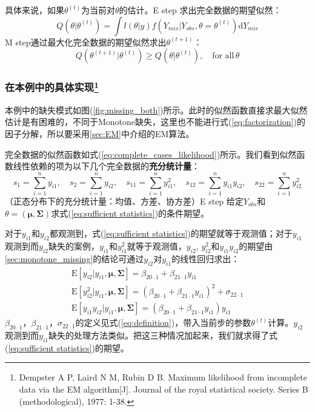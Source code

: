 \documentclass[aps,pre,12pt,preprint,onecolumn,showpacs,showkeys,AutoFakeBold]{revtex4-1}
\def \d {\mathrm d}
\begin{document}
        具体来说，如果$\theta ^{(t)}$为当前对$\theta$的估计。E step 求出完全数据的期望似然：
        \begin{equation}
            Q(\theta \vert \theta ^{(t)})=\int l(\theta \vert y)f(Y_{mis}\vert Y_{obs}, \theta=\theta^{(t)})\d Y_{mis}
        \end{equation}
        M step通过最大化完全数据的期望似然求出$\theta ^{(t+1)}$：
        \begin{equation}
            Q(\theta^{(t+1)} \vert \theta ^{(t)})\geqslant Q(\theta \vert \theta^{(t)}),\quad \text{for all}\, \theta
        \end{equation}

        \subsubsection{在本例中的具体实现\footnote{Dempster A P, Laird N M, Rubin D B. Maximum likelihood from incomplete data via the EM algorithm[J]. Journal of the royal statistical society. Series B (methodological), 1977: 1-38.}}
        本例中的缺失模式如图(\ref{fig:missing_both})所示。此时的似然函数直接求最大似然估计是有困难的，不同于Monotone缺失，这里也不能进行式(\ref{eq:factorization})的因子分解，所以要采用\ref{sec:EM}中介绍的EM算法。

        完全数据的似然函数如式(\ref{eq:complete_cases_likelihood})所示。我们看到似然函数线性依赖的项为以下几个完全数据的\textbf{充分统计量}：
        \begin{equation}\label{eq:sufficient statistics}
            s_1=\sum _{i=1}^n y_{i1},\quad
            s_2=\sum _{i=1}^n y_{i2},\quad
            s_{11}=\sum _{i=1}^n y_{i1}^2,\quad
            s_{12}=\sum _{i=1}^n y_{i1}y_{i2},\quad
            s_{22}=\sum _{i=1}^n y_{i2}^2
        \end{equation}
        （正态分布下的充分统计量：均值、方差、协方差）E step 给定$Y_{obs}$和$\theta =(\bm \mu,\bm \Sigma )$求式(\ref{eq:sufficient statistics})的条件期望。
        
        对于$y_{i1}$和$y_{i2}$都观测到，式(\ref{eq:sufficient statistics})的期望就等于观测值；对于$y_{i1}$观测到而$y_{i2}$缺失的案例，$y_{i1}$和$y_{i1}^2$就等于观测值，$y_{i2}$, $y_{i2}^2$和$y_{i1}y_{i2}$的期望由\ref{sec:monotone_missing}的结论可通过$y_{i2}$对$y_{i1}$的线性回归求出：
        \begin{eqnarray}
            \mathrm{E}[y_{i2}\vert y_{i1}, \bm \mu ,\bm \Sigma]=\beta _{20\cdot 1}+\beta _{21\cdot 1}y_{i1}\\
            \mathrm{E}[y_{i2}^2\vert y_{i1}, \bm \mu ,\bm \Sigma]=(\beta _{20\cdot 1}+\beta _{21\cdot 1}y_{i1})^2+\sigma _{22\cdot 1}\\
            \mathrm{E}[y_{i1} y_{i2}\vert y_{i1}, \bm \mu ,\bm \Sigma]=(\beta _{20\cdot 1}+\beta _{21\cdot 1}y_{i1}) y_{i1}
        \end{eqnarray}
        $\beta _{20\cdot 1}$，$\beta _{21\cdot 1}$，$\sigma _{22\cdot 1}$的定义见式(\ref{eq:definition})，带入当前步的参数$\theta ^{(t)}$计算。$y_{i2}$观测到而$y_{i1}$缺失的处理方法类似。把这三种情况加起来，我们就求得了式(\ref{eq:sufficient statistics})的期望。
\end{document}
